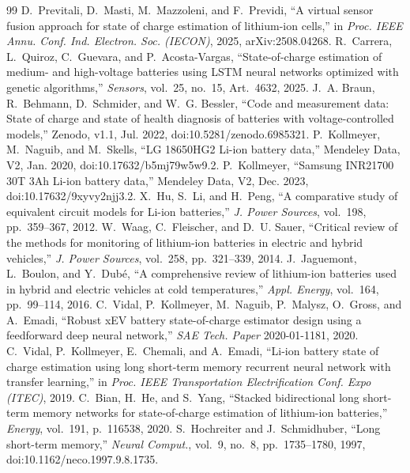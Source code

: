 \documentclass[journal]{IEEEtran}
\begin{document}
\begin{thebibliography}{99}
 D.~Previtali, D.~Masti, M.~Mazzoleni, and F.~Previdi, ``A virtual sensor fusion approach for state of charge estimation of lithium-ion cells,'' in \emph{Proc. IEEE Annu. Conf. Ind. Electron. Soc. (IECON)}, 2025, arXiv:2508.04268.
 R.~Carrera, L.~Quiroz, C.~Guevara, and P.~Acosta-Vargas, ``State-of-charge estimation of medium- and high-voltage batteries using LSTM neural networks optimized with genetic algorithms,'' \emph{Sensors}, vol.~25, no.~15, Art.~4632, 2025.
 J.~A. Braun, R.~Behmann, D.~Schmider, and W.~G. Bessler, ``Code and measurement data: State of charge and state of health diagnosis of batteries with voltage-controlled models,'' Zenodo, v1.1, Jul. 2022, doi:10.5281/zenodo.6985321.
 P.~Kollmeyer, M.~Naguib, and M.~Skells, ``LG 18650HG2 Li-ion battery data,'' Mendeley Data, V2, Jan. 2020, doi:10.17632/b5mj79w5w9.2.
 P.~Kollmeyer, ``Samsung INR21700 30T 3Ah Li-ion battery data,'' Mendeley Data, V2, Dec. 2023, doi:10.17632/9xyvy2njj3.2.
 X.~Hu, S.~Li, and H.~Peng, ``A comparative study of equivalent circuit models for {Li}-ion batteries,'' \emph{J. Power Sources}, vol.~198, pp.~359--367, 2012.
 W.~Waag, C.~Fleischer, and D.~U. Sauer, ``Critical review of the methods for monitoring of lithium-ion batteries in electric and hybrid vehicles,'' \emph{J. Power Sources}, vol.~258, pp.~321--339, 2014.
 J.~Jaguemont, L.~Boulon, and Y.~Dub{\'e}, ``A comprehensive review of lithium-ion batteries used in hybrid and electric vehicles at cold temperatures,'' \emph{Appl. Energy}, vol.~164, pp.~99--114, 2016.
 C.~Vidal, P.~Kollmeyer, M.~Naguib, P.~Malysz, O.~Gross, and A.~Emadi, ``Robust {xEV} battery state-of-charge estimator design using a feedforward deep neural network,'' \emph{SAE Tech. Paper} 2020-01-1181, 2020.
 C.~Vidal, P.~Kollmeyer, E.~Chemali, and A.~Emadi, ``{Li}-ion battery state of charge estimation using long short-term memory recurrent neural network with transfer learning,'' in \emph{Proc. IEEE Transportation Electrification Conf. Expo (ITEC)}, 2019.
 C.~Bian, H.~He, and S.~Yang, ``Stacked bidirectional long short-term memory networks for state-of-charge estimation of lithium-ion batteries,'' \emph{Energy}, vol.~191, p.~116538, 2020.
 S.~Hochreiter and J.~Schmidhuber, ``Long short-term memory,'' \emph{Neural Comput.}, vol.~9, no.~8, pp.~1735--1780, 1997, doi:10.1162/neco.1997.9.8.1735.

\end{thebibliography}
\end{document}
